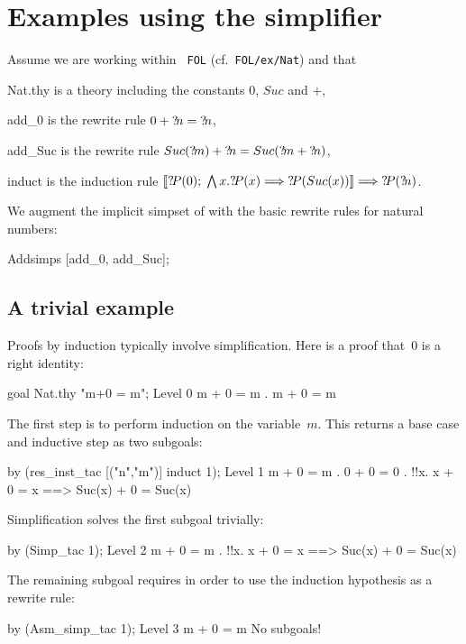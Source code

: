 \section{Examples using the simplifier}
 Assume we are working within {\tt
  FOL} (cf.\ \texttt{FOL/ex/Nat}) and that
\begin{ttdescription}
\item[Nat.thy] 
  is a theory including the constants $0$, $Suc$ and $+$,
\item[add_0]
  is the rewrite rule $0+{?\!n} = {?\!n}$,
\item[add_Suc]
  is the rewrite rule $Suc({?\!m})+{?\!n} = Suc({?\!m}+{?\!n})$,
\item[induct]
  is the induction rule $\mathopen{[\![}{?\!P}(0);\; \bigwedge x. {?\!P}(x)\Longrightarrow
    {?\!P}(Suc(x))\mathclose{]\!]} \Longrightarrow {?\!P}({?\!n})$.
\end{ttdescription}
We augment the implicit simpset of {\FOL} with the basic rewrite rules
for natural numbers:
\begin{ttbox}
Addsimps [add_0, add_Suc];
\end{ttbox}

\subsection{A trivial example}
Proofs by induction typically involve simplification.  Here is a proof
that~0 is a right identity:
\begin{ttbox}
goal Nat.thy "m+0 = m";
{\out Level 0}
{\out m + 0 = m}
{. m + 0 = m}
\end{ttbox}
The first step is to perform induction on the variable~$m$.  This returns a
base case and inductive step as two subgoals:
\begin{ttbox}
by (res_inst_tac [("n","m")] induct 1);
{\out Level 1}
{\out m + 0 = m}
{. 0 + 0 = 0}
{. !!x. x + 0 = x ==> Suc(x) + 0 = Suc(x)}
\end{ttbox}
Simplification solves the first subgoal trivially:
\begin{ttbox}
by (Simp_tac 1);
{\out Level 2}
{\out m + 0 = m}
{. !!x. x + 0 = x ==> Suc(x) + 0 = Suc(x)}
\end{ttbox}
The remaining subgoal requires  in order to use the
induction hypothesis as a rewrite rule:
\begin{ttbox}
by (Asm_simp_tac 1);
{\out Level 3}
{\out m + 0 = m}
{\out No subgoals!}
\end{ttbox}

